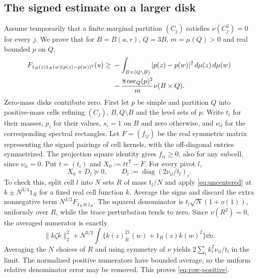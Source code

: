 \subsection{The signed estimate on a larger disk}
Assume temporarily that a finite marginal partition $(C_j)$ satisfies $\nu(C_j^2)=0$ for every $j$.
We prove that for $B=B(a,r)$, $Q=3B$, $m=\mu(Q)>0$ and real bounded $p$ on $Q$,
\begin{align}
 F_{1_B(z)1_B(w)(p(z)-p(w))^2}(u)
 \ge{}&-\int_{B\times(Q\setminus B)}|p(z)-p(w)|^2\,d\mu(z)\,d\mu(w)\notag\\
 &-\frac{8\operatorname{osc}_Q(p)^2}{m}\nu(B\times Q).\label{eq:disk}
\end{align}
Zero-mass disks contribute zero.
First let $p$ be simple and partition $Q$ into positive-mass cells refining $(C_j)$, $B,Q\setminus B$ and the level sets of $p$.
Write $t_i$ for their masses, $p_i$ for their values, $s_i=1$ on $B$ and zero otherwise, and $\nu_{il}$ for the corresponding spectral rectangles.
Let $F=(f_{ij})$ be the real symmetric matrix representing the signed pairings of cell kernels, with the off-diagonal entries symmetrized.
The projection square identity gives $f_{ii}\ge0$, also for any subcell, since $\nu_{ii}=0$.
Put $t=(t_i)$ and $X_0:=tt^{\mathsf T}-F$.
For every pivot $l$,
\begin{equation}\label{eq:row-positive}
 X_0+D_l\succeq0,\qquad D_l:=\operatorname{diag}(2\nu_{il}/t_l)_i.
\end{equation}
To check this, split cell $l$ into $N$ sets $R$ of mass $t_l/N$ and apply \eqref{eq:uncentered} at $k\pm N^{3/4}1_R$ for a fixed real cell function $k$.
Average the signs and discard the extra nonnegative term $N^{3/2}F_{1_R\otimes1_R}$.
The squared denominator is $t_l\sqrt N(1+o(1))$, uniformly over $R$, while the trace perturbation tends to zero.
Since $\nu(R^2)=0$, the averaged numerator is exactly
\[
 \|k\zeta k\|_2^2+N^{3/2}\int\{k(z)^21_R(w)+1_R(z)k(w)^2\}\dd\nu.
\]
Averaging the $N$ choices of $R$ and using symmetry of $\nu$ yields $2\sum_i k_i^2\nu_{il}/t_l$ in the limit.
The normalized positive numerators have bounded average, so the uniform relative denominator error may be removed.
This proves \eqref{eq:row-positive}.


